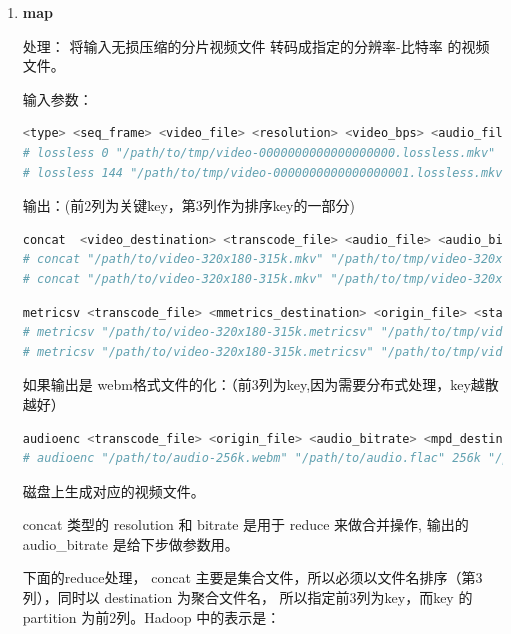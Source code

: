 \begin{enumerate}
  \item \textbf{map}

处理：
将输入无损压缩的分片视频文件 转码成指定的分辨率-比特率 的视频文件。


输入参数：
\begin{lstlisting}[language=bash]
<type> <seq_frame> <video_file> <resolution> <video_bps> <audio_file> <audio_bps>
# lossless 0 "/path/to/tmp/video-0000000000000000000.lossless.mkv"  320x180 315k "/path/to/audio1.flac" 64k
# lossless 144 "/path/to/tmp/video-0000000000000000001.lossless.mkv"  320x180 315k "/path/to/audio1.flac" 64k
\end{lstlisting}

输出：(前2列为关键key，第3列作为排序key的一部分)
\begin{lstlisting}[language=bash]
concat  <video_destination> <transcode_file> <audio_file> <audio_bitrate>
# concat "/path/to/video-320x180-315k.mkv" "/path/to/tmp/video-320x180-315k-0000000000000000000.mkv" "/path/to/audio1.flac" 64k
# concat "/path/to/video-320x180-315k.mkv" "/path/to/tmp/video-320x180-315k-0000000000000000001.mkv" "/path/to/audio1.flac" 64k
\end{lstlisting}

\begin{lstlisting}[language=bash]
metricsv <transcode_file> <mmetrics_destination> <origin_file> <start_frame_number> <screen_resolution>
# metricsv "/path/to/video-320x180-315k.metricsv" "/path/to/tmp/video-320x180-315k-0000000000000000000.mkv" "/path/to/tmp/video-lossless-0000000000000000000.mkv" 0 1280x720
# metricsv "/path/to/video-320x180-315k.metricsv" "/path/to/tmp/video-320x180-315k-0000000000000000001.mkv" "/path/to/tmp/video-lossless-0000000000000000001.mkv" 144 1280x720
\end{lstlisting}

如果输出是 webm格式文件的化：（前3列为key,因为需要分布式处理，key越散越好）
\begin{lstlisting}[language=bash]
audioenc <transcode_file> <origin_file> <audio_bitrate> <mpd_destination>
# audioenc "/path/to/audio-256k.webm" "/path/to/audio.flac" 256k "/path/to/video.gwebm.mpd"
\end{lstlisting}


磁盘上生成对应的视频文件。

concat 类型的 resolution 和 bitrate 是用于 reduce 来做合并操作, 输出的 audio\_bitrate 是给下步做参数用。

下面的reduce处理， concat 主要是集合文件，所以必须以文件名排序（第3列），同时以 destination 为聚合文件名，
所以指定前3列为key，而key 的 partition 为前2列。Hadoop 中的表示是：


\end{enumerate}
